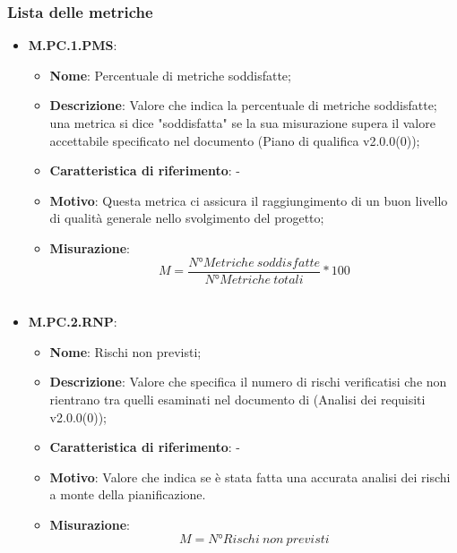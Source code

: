 \documentclass[10pt, a4paper]{article}
\begin{document}


\subsubsection{Lista delle metriche}

\begin{itemize}
    \item \textbf{M.PC.1.PMS}:
    \begin{itemize}
        \item \textbf{Nome}: Percentuale di metriche soddisfatte;
        \item \textbf{Descrizione}: Valore che indica la percentuale di metriche soddisfatte; una metrica si dice "soddisfatta" se la sua misurazione supera il valore accettabile specificato nel documento (Piano di qualifica v2.0.0(0)); 
        \item \textbf{Caratteristica di riferimento}: -
        \item \textbf{Motivo}: Questa metrica ci assicura il raggiungimento di un buon livello di qualità generale nello svolgimento del progetto;
        \item \textbf{Misurazione}: \  \[ M=\frac{N° Metriche \ soddisfatte}{N° Metriche\ totali} * 100 \] \\
    \end{itemize}
  
     \item \textbf{M.PC.2.RNP}:
    \begin{itemize}
        \item \textbf{Nome}: Rischi non previsti;
        \item \textbf{Descrizione}: Valore che specifica il numero di rischi verificatisi che non rientrano tra quelli esaminati nel documento di (Analisi dei requisiti v2.0.0(0));
        \item \textbf{Caratteristica di riferimento}: -
        \item \textbf{Motivo}: Valore che indica se è stata fatta una accurata analisi dei rischi a monte della pianificazione. 
        \item \textbf{Misurazione}:  \[
        M=N°Rischi \ non \ previsti
        \] \\
    \end{itemize}
 


\end{itemize}
\end{document}
